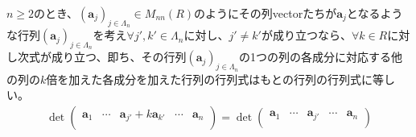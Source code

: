 \documentclass[dvipdfmx]{jsarticle}
\begin{document}
\begin{thm}\label{2.1.11.6}
$n \geq 2$のとき、$\left( \mathbf{a}_{j} \right)_{j \in \varLambda_{n}} \in M_{nn}(R)$のようにその列vectorたちが$\mathbf{a}_{j}$となるような行列$\left( \mathbf{a}_{j} \right)_{j \in \varLambda_{n}}$を考え$\forall j',k' \in \varLambda_{n}$に対し、$j' \neq k'$が成り立つなら、$\forall k \in R$に対し次式が成り立つ、即ち、その行列$\left( \mathbf{a}_{j} \right)_{j \in \varLambda_{n}}$の1つの列の各成分に対応する他の列の$k$倍を加えた各成分を加えた行列の行列式はもとの行列の行列式に等しい。
\begin{align*}
\det\begin{pmatrix}
\mathbf{a}_{1} & \cdots & \mathbf{a}_{j'} + k\mathbf{a}_{k'} & \cdots & \mathbf{a}_{n} \\
\end{pmatrix} = \det\begin{pmatrix}
\mathbf{a}_{1} & \cdots & \mathbf{a}_{j'} & \cdots & \mathbf{a}_{n} \\
\end{pmatrix}
\end{align*}
\end{thm}
\end{document}
